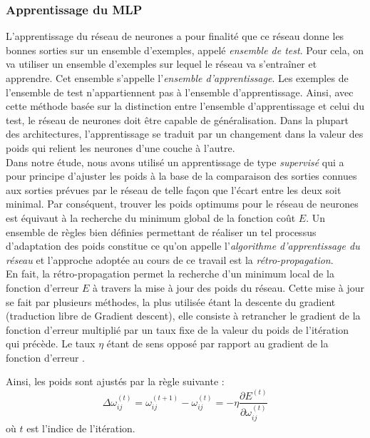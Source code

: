 \subsubsection{Apprentissage du MLP}

L’apprentissage du réseau de neurones a pour finalité que ce réseau donne les bonnes sorties sur un ensemble d’exemples, appelé \textit{ensemble de test}. Pour cela, on va utiliser un ensemble d’exemples sur lequel le réseau va s’entraîner et apprendre. Cet ensemble s’appelle l’\textit{ensemble d’apprentissage}. Les exemples de l’ensemble de test n’appartiennent pas à l’ensemble d’apprentissage. Ainsi, avec cette méthode basée sur la distinction entre l’ensemble d’apprentissage et celui du test, le réseau de neurones doit être capable de généralisation. Dans la plupart des architectures, l’apprentissage se traduit par un changement dans la valeur des poids qui relient les neurones d’une couche à l’autre.\\

Dans notre étude, nous avons utilisé un apprentissage de type \textit{supervisé} qui a pour principe d’ajuster les poids à la base de la comparaison des sorties connues aux sorties prévues par le réseau de telle façon que l’écart entre les deux soit minimal. Par conséquent, trouver les poids optimums pour le réseau de neurones est équivaut à la recherche du minimum global de la fonction coût $E$. Un ensemble de règles bien définies permettant de réaliser un tel processus d’adaptation des poids constitue ce qu’on appelle l’\textit{algorithme d’apprentissage du réseau} et l'approche adoptée au cours de ce travail est la \textit{rétro-propagation}.\\

En fait, la rétro-propagation permet la recherche d’un minimum local de la fonction d’erreur $E$ à travers la mise à jour des poids du réseau. Cette mise à jour se fait par plusieurs méthodes, la plus utilisée étant la descente du gradient (traduction libre de Gradient descent), elle consiste à retrancher le gradient de la fonction d’erreur multiplié par un taux fixe de la valeur du poids de l’itération qui précède. Le taux $\eta$ étant de sens opposé par rapport au gradient de la fonction d’erreur \citep{gunther2010neuralnet}.

Ainsi, les poids sont ajustés par la règle suivante :
            \begin{equation}
            \Delta\omega_{ij}^{(t)}=\omega_{ij}^{(t+1)}-\omega_{ij}^{(t)}=-\eta
            \frac{\partial E^{(t)}}{\partial \omega_{ij}^{(t)}}
            \end{equation}
            où $t$ est l'indice de l'itération.\\

